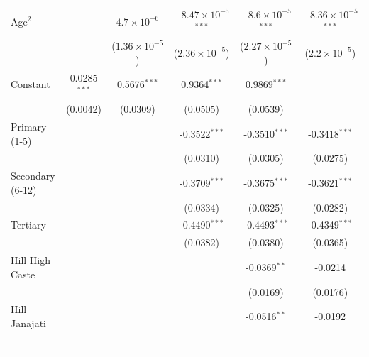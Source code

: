 \begin{tabular}{lccccc}
   Age$^2$                           &                 & $4.7\times 10^{-6}$     & $-8.47\times 10^{-5}$$^{***}$  & $-8.6\times 10^{-5}$$^{***}$  & $-8.36\times 10^{-5}$$^{***}$\\    
                                     &                 & ($1.36\times 10^{-5}$)  & ($2.36\times 10^{-5}$)         & ($2.27\times 10^{-5}$)        & ($2.2\times 10^{-5}$)\\    
   Constant                          & 0.0285$^{***}$  & 0.5676$^{***}$          & 0.9364$^{***}$                 & 0.9869$^{***}$                &   \\   
                                     & (0.0042)        & (0.0309)                & (0.0505)                       & (0.0539)                      &   \\   
   Primary (1-5)                     &                 &                         & -0.3522$^{***}$                & -0.3510$^{***}$               & -0.3418$^{***}$\\   
                                     &                 &                         & (0.0310)                       & (0.0305)                      & (0.0275)\\   
   Secondary (6-12)                  &                 &                         & -0.3709$^{***}$                & -0.3675$^{***}$               & -0.3621$^{***}$\\   
                                     &                 &                         & (0.0334)                       & (0.0325)                      & (0.0282)\\   
   Tertiary                          &                 &                         & -0.4490$^{***}$                & -0.4493$^{***}$               & -0.4349$^{***}$\\   
                                     &                 &                         & (0.0382)                       & (0.0380)                      & (0.0365)\\   
   Hill High Caste                   &                 &                         &                                & -0.0369$^{**}$                & -0.0214\\   
                                     &                 &                         &                                & (0.0169)                      & (0.0176)\\   
   Hill Janajati                     &                 &                         &                                & -0.0516$^{**}$                & -0.0192\\   
$$
\end{tabular}
